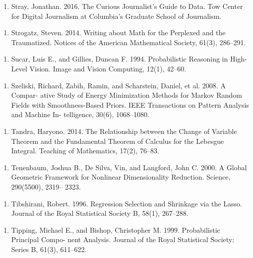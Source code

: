 \begin{enumerate}
\item Stray, Jonathan. 2016. The Curious Journalist’s Guide to Data. Tow Center for Digital Journalism at Columbia’s Graduate School of Journalism.
\end{enumerate}

\begin{enumerate}
\item Strogatz, Steven. 2014. Writing about Math for the Perplexed and the Traumatized. Notices of the American Mathematical Society, 61(3), 286–291.
\end{enumerate}

\begin{enumerate}
\item Sucar, Luis E., and Gillies, Duncan F. 1994. Probabilistic Reasoning in High-Level Vision. Image and Vision Computing, 12(1), 42–60.
\end{enumerate}

\begin{enumerate}
\item Szeliski, Richard, Zabih, Ramin, and Scharstein, Daniel, et al. 2008. A Compar- ative Study of Energy Minimization Methods for Markov Random Fields with Smoothness-Based Priors. IEEE Transactions on Pattern Analysis and Machine In- telligence, 30(6), 1068–1080.
\end{enumerate}

\begin{enumerate}
\item Tandra, Haryono. 2014. The Relationship between the Change of Variable Theorem and the Fundamental Theorem of Calculus for the Lebesgue Integral. Teaching of Mathematics, 17(2), 76–83.
\end{enumerate}

\begin{enumerate}
\item Tenenbaum, Joshua B., De Silva, Vin, and Langford, John C. 2000. A Global Geometric Framework for Nonlinear Dimensionality Reduction. Science, 290(5500), 2319– 2323.
\end{enumerate}

\begin{enumerate}
\item Tibshirani, Robert. 1996. Regression Selection and Shrinkage via the Lasso. Journal of the Royal Statistical Society B, 58(1), 267–288.
\end{enumerate}

\begin{enumerate}
\item Tipping, Michael E., and Bishop, Christopher M. 1999. Probabilistic Principal Compo- nent Analysis. Journal of the Royal Statistical Society: Series B, 61(3), 611–622.
\end{enumerate}

